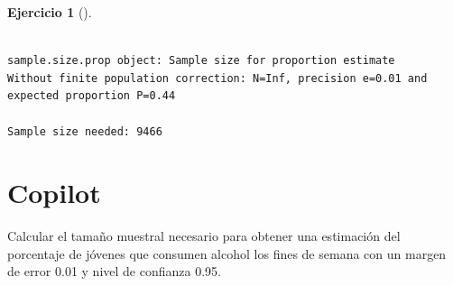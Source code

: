 \documentclass[
  a4paper,
]{scrreport}
\newenvironment{Shaded}{\begin{snugshade}}{\end{snugshade}}
\newcommand{\ExtensionTok}[1]{\textcolor[rgb]{0.00,0.23,0.31}{#1}}
\newcommand{\NormalTok}[1]{\textcolor[rgb]{0.00,0.23,0.31}{#1}}
\theoremstyle{definition}
\newtheorem{exercise}{Ejercicio}[chapter]
\theoremstyle{remark}
\begin{document}
\begin{exercise}[]
\begin{enumerate}
\begin{tcolorbox}
\begin{verbatim}

sample.size.prop object: Sample size for proportion estimate
Without finite population correction: N=Inf, precision e=0.01 and expected proportion P=0.44

Sample size needed: 9466
\end{verbatim}

  \section{Copilot}

\begin{Shaded}
\begin{Highlighting}[]
\ExtensionTok{Calcular}\NormalTok{ el tamaño muestral necesario para obtener una estimación del porcentaje de jóvenes que consumen alcohol los fines de semana con un margen de error 0.01 y nivel de confianza 0.95.}
\end{Highlighting}
\end{Shaded}

  \end{tcolorbox}
\end{enumerate}

\end{exercise}
\end{document}
